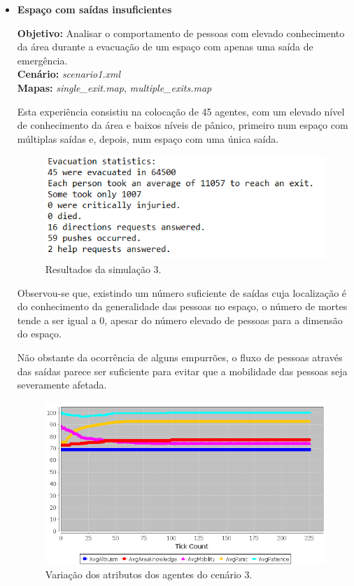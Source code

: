 \documentclass[12pt]{article}
\begin{document}
\begin{titlepage}
\begin{itemize}
\item \textbf{Espaço com saídas insuficientes}

\textbf{Objetivo:} 
Analisar o comportamento de pessoas com elevado conhecimento da área durante a evacuação de um espaço com apenas uma saída de emergência.
\\\textbf{Cenário:} 
\textit{scenario1.xml}
\\\textbf{Mapas:} 
\textit{single\_exit.map}, \textit{multiple\_exits.map}
\newline

Esta experiência consistiu na colocação de 45 agentes, com um elevado nível de conhecimento da área e baixos níveis de pânico, primeiro num espaço com múltiplas saídas e, depois, num espaço com uma única saída.

\begin{figure}[H]
	\centering
	\includegraphics{log_sc3.png}
	\caption{Resultados da simulação 3.}
	\label{log_sc3}
\end{figure}

Observou-se que, existindo um número suficiente de saídas cuja localização é do conhecimento da generalidade das pessoas no espaço, o número de mortes tende a ser igual a 0, apesar do número elevado de pessoas para a dimensão do espaço. 

Não obstante da ocorrência de alguns empurrões, o fluxo de pessoas através das saídas parece ser suficiente para evitar que a mobilidade das pessoas seja severamente afetada.

\begin{figure}[H]
	\centering
	\includegraphics{graph_sc3.png}
	\caption{Variação dos atributos dos agentes do cenário 3.}
	\label{graph_sc3}
\end{figure}


\end{itemize}
\end{titlepage}
\end{document}
